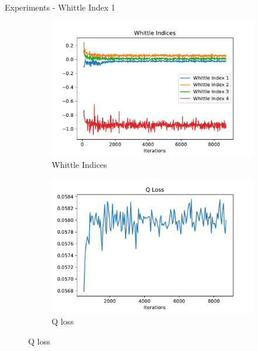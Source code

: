 \documentclass{beamer}
\begin{document}
\begin{frame}{Experiments - Whittle Index 1}
    \begin{figure}[H]
\ContinuedFloat
     \captionsetup[subfigure]{justification=centering}
     \centering
     \begin{subfigure}{0.48\linewidth}
         \centering
         \includegraphics[width=0.8\linewidth]{all.pdf}
         \caption{Whittle Indices}
         \label{Whittle Indices1}
     \end{subfigure}
     \begin{subfigure}{0.48\linewidth}
         \centering
         \includegraphics[width=0.8\linewidth]{Q Loss.pdf}
         \caption{Q loss}
         \label{}
     \end{subfigure}
     

\end{figure}
\end{frame}
\end{document}
